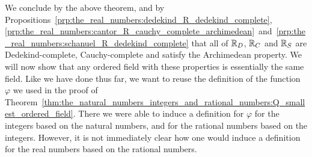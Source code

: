 \documentclass[../main.tex]{subfiles}
\begin{document}
We conclude by the above theorem, and by Propositions~\ref{prp:the_real_numbers:dedekind_R_dedekind_complete},\linebreak\ref{prp:the_real_numbers:cantor_R_cauchy_complete_archimedean}~and~\ref{prp:the_real_numbers:schanuel_R_dedekind_complete} that all of $\mathbb{R}_D$, $\mathbb{R}_C$ and $\mathbb{R}_S$ are Dedekind-complete, Cauchy-complete and satisfy the Archimedean property. We will now show that any ordered field with these properties is essentially the same field. Like we have done thus far, we want to reuse the definition of the function $\varphi$ we used in the proof of Theorem~\ref{thm:the_natural_numbers_integers_and_rational_numbers:Q_smallest_ordered_field}. There we were able to induce a definition for $\varphi$ for the integers based on the natural numbers, and for the rational numbers based on the integers. However, it is not immediately clear how one would induce a definition for the real numbers based on the rational numbers.
\end{document}
